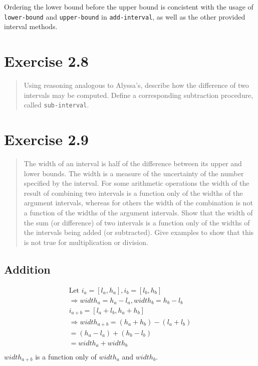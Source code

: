\documentclass{article}
\begin{document}

Ordering the lower bound before the upper bound is concistent with the usage of
\texttt{lower-bound} and \texttt{upper-bound} in \texttt{add-interval}, as well
as the other provided interval methods.

\section{Exercise 2.8}
\begin{quote}
    Using reasoning analogous to Alyssa's, describe how the difference of two
    intervals may be computed. Define a corresponding subtraction procedure,
    called \texttt{sub-interval}.
\end{quote}



\section{Exercise 2.9}
\begin{quote}
    The width of an interval is half of the difference between its upper and
    lower bounds. The width is a measure of the uncertainty of the number
    specified by the interval. For some arithmetic operations the width of the
    result of combining two intervals is a function only of the widths of the
    argument intervals, whereas for others the width of the combination is not
    a function of the widths of the argument intervals. Show that the width of
    the sum (or difference) of two intervals is a function only of the widths
    of the intervals being added (or subtracted). Give examples to show that
    this is not true for multiplication or division.
\end{quote}

\subsection{Addition}
\begin{equation*}
    \begin{split}
        \textrm{Let }i_a = [l_a, h_a], i_b = [l_b, h_b] \\
        \Rightarrow width_a = h_a - l_a, width_b = h_b - l_b \\
        i_{a+b} = [l_a + l_b, h_a + h_b] \\
        \Rightarrow width_{a+b} = (h_a + h_b) - (l_a + l_b) \\
                                = (h_a - l_a) + (h_b - l_b) \\
                                = width_a + width_b \\
    \end{split}
\end{equation*}
$width_{a+b}$ is a function only of $width_a$ and $width_b$.
\end{document}
